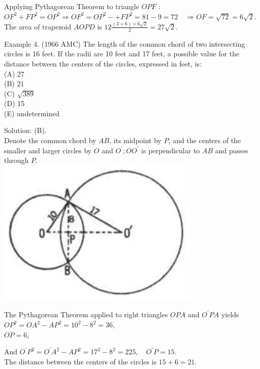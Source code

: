 \documentclass[10pt]{article}
\begin{document}
Applying Pythagorean Theorem to triangle \(O P F\) :\\
\(O F^{2}+F P^{2}=O P^{2} \Rightarrow O F^{2}=O P^{2}-+F P^{2}=81-9=72 \quad \Rightarrow O F=\sqrt{72}=6 \sqrt{2}\).\\
The area of trapezoid \(A O P D\) is \(12 \frac{(3+6) \times 6 \sqrt{2}}{2}=27 \sqrt{2}\).

Example 4. (1966 AMC) The length of the common chord of two intersecting circles is 16 feet. If the radii are 10 feet and 17 feet, a possible value for the distance between the centers of the circles, expressed in feet, is:\\
(A) 27\\
(B) 21\\
(C) \(\sqrt{389}\)\\
(D) 15\\
(E) undetermined

Solution: (B).\\
Denote the common chord by \(A B\), its midpoint by \(P\), and the centers of the smaller and larger circles by \(O\) and \(O^{\prime} ; O O^{\prime}\) is perpendicular to \(A B\) and passes through \(P\).\\
\includegraphics[max width=\textwidth, center]{2025_04_17_97bc1f7e44d93c271a88g-177(1)}

The Pythagorean Theorem applied to right triangles \(O P A\) and \(O^{\prime} P A\) yields \(O P^{2}=O A^{2}-A P^{2}=10^{2}-8^{2}=36\),\\
\(O P=6\),


And \(O^{\prime} P^{2}=O^{\prime} A^{2}-A P^{2}=17^{2}-8^{2}=225, \quad O^{\prime} P=15\).\\
The distance between the centers of the circles is \(15+6=21\).
\end{document}
